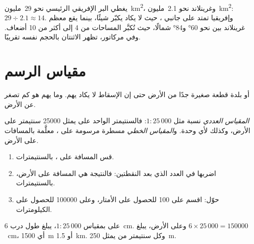 \begin{example}
يغطي البر الإفريقي الرئيسي نحو 29~مليون~\unit{km^2}، وغرينلاند نحو
2.1~مليون~\unit{km^2}: $29 \div 2.1 \approx 14$. وإفريقيا تمتد على جانبي
، حيث لا يكاد  يكبّر شيئًا، بينما يقع معظم
غرينلاند بين نحو \ang{60} و\ang{84} شمالًا، حيث تُكبَّر المساحات من 4 إلى
أكثر من 10 أضعاف. وفي  مركاتور، تظهر الاثنتان بالحجم نفسه
تقريبًا.
\end{example}

\section{مقياس الرسم}

  أو بلدة قطعة صغيرة جدًا من الأرض حتى إن الإسقاط لا يكاد يهم.
وما يهم هو كم تصغر  عن
الأرض.

\begin{definition}\label{def:g9:maps-of-the-earth:numerical-scale}
\emph{المقياس العددي}  نسبة مثل
$1 : 25\,000$: فالسنتيمتر الواحد على  يمثل \num{25000}
سنتيمتر على الأرض، وكذلك لأي وحدة. و\emph{المقياس الخطي}
مسطرة مرسومة على ، معلَّمة بالمسافات على
الأرض.
\end{definition}

\begin{method}
\begin{enumerate}
  \item قس المسافة على ، بالسنتيمترات.
  \item اضربها في العدد الذي بعد النقطتين: فالنتيجة هي المسافة على
        الأرض، بالسنتيمترات.
  \item حوّل: اقسم على 100 للحصول على الأمتار، وعلى \num{100000} للحصول على الكيلومترات.
\end{enumerate}
\end{method}

\begin{example}
على  بمقياس $1 : 25\,000$، يبلغ طول درب \qty{6}{cm}. وعلى الأرض،
يبلغ $6 \times 25\,000 = \num{150000}$~cm، أي \qty{1500}{m} أو
\qty{1.5}{km}. وكل سنتيمتر من  يمثل \qty{250}{m}.
\end{example}

